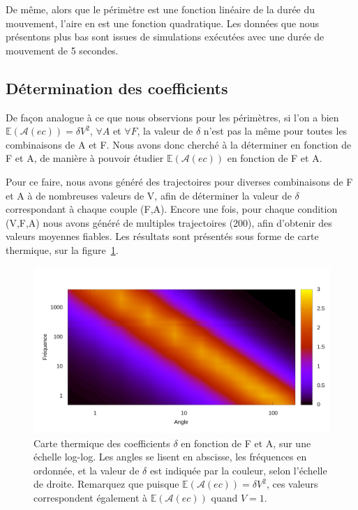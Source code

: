 	De même, alors que le périmètre est une fonction linéaire de la durée du mouvement, l'aire en est une fonction quadratique. Les données que nous présentons plus bas sont issues de simulations exécutées avec une durée de mouvement de 5 secondes.
	
	\subsection{Détermination des coefficients}
	De façon analogue à ce que nous observions pour les périmètres, si l'on a bien $\mathbb{E}(\mathcal{A}(ec)) = \delta{}V^{2}$, $\forall A$ et $\forall F$, la valeur de $\delta$ n'est pas la même pour toutes les combinaisons de A et F. Nous avons donc cherché à la déterminer en fonction de F et A, de manière à pouvoir étudier $\mathbb{E}(\mathcal{A}(ec))$ en fonction de F et A.
	
	Pour ce faire, nous avons généré des trajectoires pour diverses combinaisons de F et A à de nombreuses valeurs de V, afin de déterminer la valeur de $\delta$ correspondant à chaque couple (F,A). Encore une fois, pour chaque condition (V,F,A) nous avons généré de multiples trajectoires (200), afin d'obtenir des valeurs moyennes fiables. Les résultats sont présentés sous forme de carte thermique, sur la figure~\ref{fig:afRealDelta_log}.
	
	\begin{figure}[!htbp]
		\centering
		\includegraphics[width=\textwidth]{figures/ch4/afRealDelta_log}
		\caption[Coefficients $\delta$ en fonction de F et A]{Carte thermique des coefficients $\delta$ en fonction de F et A, sur une échelle log-log. Les angles se lisent en abscisse, les fréquences en ordonnée, et la valeur de $\delta$ est indiquée par la couleur, selon l'échelle de droite. Remarquez que puisque $\mathbb{E}(\mathcal{A}(ec)) = \delta{}V^{2}$, ces valeurs correspondent également à $\mathbb{E}(\mathcal{A}(ec))$ quand $V = 1$.}
		\label{fig:afRealDelta_log}
	\end{figure}
	
